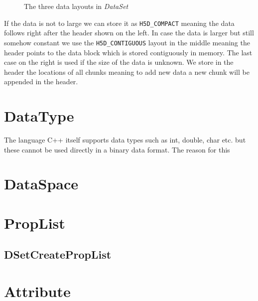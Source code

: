 \begin{figure}[ht!]
\caption{The three data layouts in \textit{DataSet}}
\label{fig:datalayout}
\end{figure}


If the data is not to large we can store it as \texttt{H5D\_COMPACT} meaning the data follows right after the header shown on the left. In case the data is larger but still somehow constant we use the \texttt{H5D\_CONTIGUOUS} layout in the middle meaning the header points to the data block which is stored contiguously in memory. The last case on the right is used if the size of the data is unknown. We store in the header the locations of all chunks meaning to add new data a new chunk will be appended in the header.



\section{DataType}
The language C++ itself supports data types such as int, double, char etc. but these cannot be used directly in a binary data format. The reason for this 
\section{DataSpace}
\section{PropList}
\subsection{DSetCreatePropList}
\section{Attribute}



